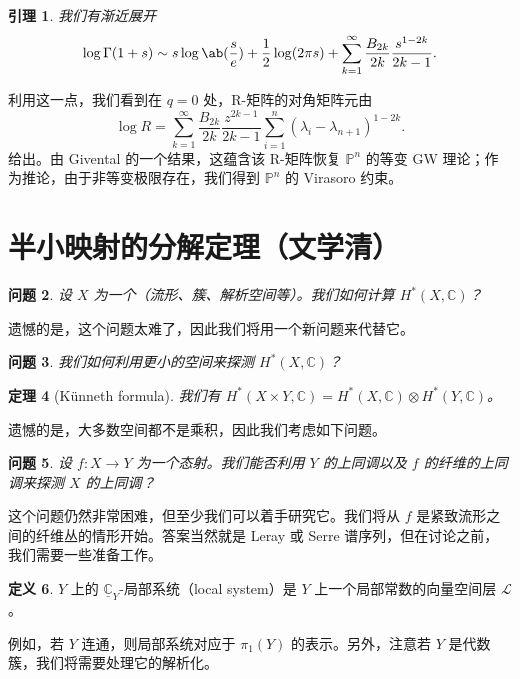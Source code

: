 \documentclass{amsart}
\newtheorem{thm}{定理}[section]
\newtheorem{lem}[thm]{引理}
\newtheorem{quest}[thm]{问题}
\theoremstyle{definition}
\newtheorem{defn}[thm]{定义}
\theoremstyle{remark}
\theoremstyle{plain}
\theoremstyle{definition}
\theoremstyle{remark}
\newcommand{\C}{\mathbb{C}}
\renewcommand{\P}{\mathbb{P}}
\newcommand{\mc}[1]{\mathcal{#1}}
\newcommand{\ul}[1]{\underline{#1}}
\newcommand{\1}{\mathbf{1}}
\newcommand{\2}{\mathbf{2}}
\newcommand{\3}{\mathbf{3}}
\begin{document}
\begin{lem}
    我们有渐近展开
    \[ \log \Gamma(1+s) \sim s \log \ab(\frac{s}{e}) + \frac{1}{2} \log(2\pi s) + \sum_{k=1}^{\infty} \frac{B_{2k}}{2k} \frac{s^{1-2k}}{2k-1}. \]
\end{lem}
利用这一点，我们看到在 \(q = 0\) 处，R-矩阵的对角矩阵元由
\[ \log R = \sum_{k=1}^{\infty} \frac{B_{2k}}{2k} \frac{z^{2k-1}}{2k-1} \sum_{i =1}^n (\lambda_i - \lambda_{n+1})^{1-2k}. \]
给出。由 Givental 的一个结果，这蕴含该 R-矩阵恢复 \(\P^n\) 的等变 GW 理论；作为推论，由于非等变极限存在，我们得到 \(\P^n\) 的 Virasoro 约束。\section{半小映射的分解定理（文学清）}%
\label{sec:Decomposition theorem for semi-small maps (Xueqing Wen)}

\begin{quest}
    设 \(X\) 为一个（流形、簇、解析空间等）。我们如何计算 \(H^*(X, \C)\)？
\end{quest}

遗憾的是，这个问题太难了，因此我们将用一个新问题来代替它。

\begin{quest}
    我们如何利用更小的空间来探测 \(H^*(X, \C)\)？
\end{quest}

\begin{thm}[K\"unneth formula]
    我们有 \(H^*(X \times Y, \C) = H^*(X, \C) \otimes H^*(Y, \C)\)。
\end{thm}

遗憾的是，大多数空间都不是乘积，因此我们考虑如下问题。

\begin{quest}
    设 \(f \colon X \to Y\) 为一个态射。我们能否利用 \(Y\) 的上同调以及 \(f\) 的纤维的上同调来探测 \(X\) 的上同调？
\end{quest}

这个问题仍然非常困难，但至少我们可以着手研究它。我们将从 \(f\) 是紧致流形之间的纤维丛的情形开始。答案当然就是 Leray 或 Serre 谱序列，但在讨论之前，我们需要一些准备工作。

\begin{defn}
    \(Y\) 上的 \(\ul{\C}_Y\)-局部系统（local system）是 \(Y\) 上一个局部常数的向量空间层 \(\mc{L}\)。
\end{defn}

例如，若 \(Y\) 连通，则局部系统对应于 \(\pi_1(Y)\) 的表示。另外，注意若 \(Y\) 是代数簇，我们将需要处理它的解析化。
\end{document}

